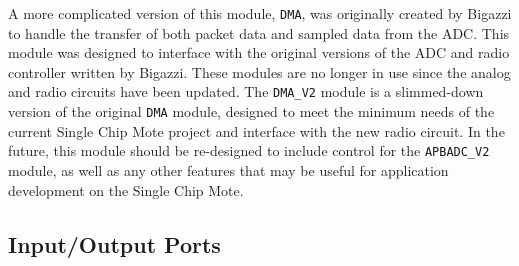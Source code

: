 A more complicated version of this module, \texttt{DMA}, was originally created by Bigazzi to handle the transfer of both packet data and sampled data from the ADC. This module was designed to interface with the original versions of the ADC and radio controller written by Bigazzi. These modules are no longer in use since the analog and radio circuits have been updated. The \texttt{DMA\_V2} module is a slimmed-down version of the original \texttt{DMA} module, designed to meet the minimum needs of the current Single Chip Mote project and interface with the new radio circuit. In the future, this module should be re-designed to include control for the \texttt{APBADC\_V2} module, as well as any other features that may be useful for application development on the Single Chip Mote. 

\subsection{Input/Output Ports}
